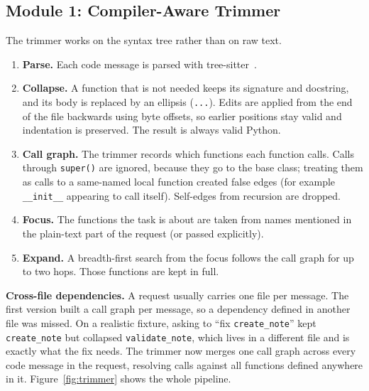 \documentclass[12pt, a4paper, oneside]{report}
\newcommand{\code}[1]{\texttt{#1}}
\begin{document}
\subsection{Module 1: Compiler-Aware Trimmer}

The trimmer works on the syntax tree rather than on raw text.

\begin{enumerate}
    \item \textbf{Parse.} Each code message is parsed with tree-sitter~\cite{treesitter}.
    \item \textbf{Collapse.} A function that is not needed keeps its signature and
          docstring, and its body is replaced by an ellipsis (\code{...}). Edits are applied from
          the end of the file backwards using byte offsets, so earlier positions
          stay valid and indentation is preserved. The result is always valid
          Python.
    \item \textbf{Call graph.} The trimmer records which functions each function
          calls. Calls through \code{super()} are ignored, because they go to the
          base class; treating them as calls to a same-named local function created
          false edges (for example \code{\_\_init\_\_} appearing to call itself).
          Self-edges from recursion are dropped.
    \item \textbf{Focus.} The functions the task is about are taken from names
          mentioned in the plain-text part of the request (or passed explicitly).
    \item \textbf{Expand.} A breadth-first search from the focus follows the call
          graph for up to two hops. Those functions are kept in full.
\end{enumerate}

\textbf{Cross-file dependencies.} A request usually carries one file per message.
The first version built a call graph per message, so a dependency defined in
another file was missed. On a realistic fixture, asking to ``fix
\code{create\_note}'' kept \code{create\_note} but collapsed \code{validate\_note},
which lives in a different file and is exactly what the fix needs. The trimmer now
merges one call graph across every code message in the request, resolving calls
against all functions defined anywhere in it. Figure~\ref{fig:trimmer} shows the
whole pipeline.
\end{document}
